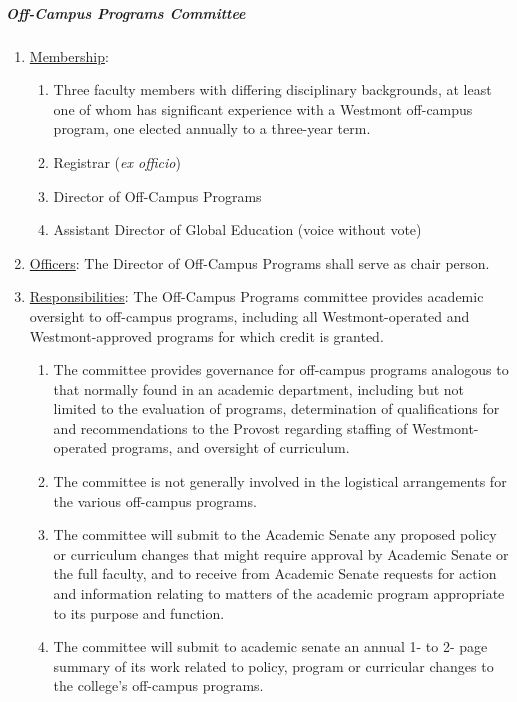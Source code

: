 				\subparagraph{Off-Campus Programs Committee}
					\begin{enumerate}[label=\alph*)]
						\item{\underline{Membership}:
							\begin{enumerate}[label=\arabic*)]
								\item{Three faculty members with differing disciplinary backgrounds, at least one of whom has significant experience with a Westmont off-campus program, one elected annually to a three-year term.}
								\item{ Registrar (\emph{ex officio})}
								\item{Director of Off-Campus Programs}
								\item{Assistant Director of Global Education (voice without vote)}
							\end{enumerate}
						}
						\item{\underline{Officers}:
							The Director of Off-Campus Programs shall serve as chair person.
						}
						\item{\underline{Responsibilities}: The Off-Campus Programs committee provides academic oversight to off-campus programs, including all Westmont-operated and Westmont-approved programs for which credit is granted.
							\begin{enumerate}[label=\arabic*)]
								\item{The committee provides governance for off-campus programs analogous to that normally found in an academic department, including but not limited to the evaluation of programs, determination of qualifications for and recommendations to the Provost regarding staffing of Westmont-operated programs, and oversight of curriculum.}
								\item{The committee is not generally involved in the logistical arrangements for the various off-campus programs.}
								\item{The committee will submit to the Academic Senate any proposed policy or curriculum changes that might require approval by Academic Senate or the full faculty, and to receive from Academic Senate requests for action and information relating to matters of the academic program appropriate to its purpose and function.}
								\item{The committee will submit to academic senate an annual 1- to 2- page summary of its work related to policy, program or curricular changes to the college's off-campus programs.}
							\end{enumerate}
						}
					\end{enumerate}
